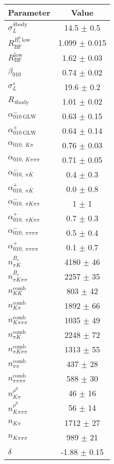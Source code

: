 \begin{table}[h]
  \centering
  \begin{tabular}{lc}
      \toprule
      Parameter & Value \\
      \midrule
      $\sigma_L^{\mathrm{4body}}$ & 14.5 $\pm$ 0.5 \\
      $R_\mathrm{BF}^{B^0_s\ \mathrm{low}}$ & 1.099 $\pm$ 0.015 \\
      $R_\mathrm{BF}^{\mathrm{low}}$ & 1.62 $\pm$ 0.03 \\
      $\beta_{010}$ & 0.74 $\pm$ 0.02 \\
      $\sigma_L^s$ & 19.6 $\pm$ 0.2 \\
      $R_{\mathrm{4body}}$ & 1.01 $\pm$ 0.02 \\
      $\alpha_{010\ \mathrm{GLW}}^-$ & 0.63 $\pm$ 0.15 \\
      $\alpha_{010\ \mathrm{GLW}}^+$ & 0.64 $\pm$ 0.14 \\
      $\alpha_{010,\ K\pi}$ & 0.76 $\pm$ 0.03 \\
      $\alpha_{010,\ K\pi\pi\pi}$ & 0.71 $\pm$ 0.05 \\
      $\alpha_{010,\ \pi K}^-$ & 0.4 $\pm$ 0.3 \\
      $\alpha_{010,\ \pi K}^+$ & 0.0 $\pm$ 0.8 \\
      $\alpha_{010,\ \pi K\pi\pi}^-$ & 1 $\pm$ 1 \\
      $\alpha_{010,\ \pi K\pi\pi}^+$ & 0.7 $\pm$ 0.3 \\
      $\alpha_{010,\ \pi\pi\pi\pi}^-$ & 0.5 $\pm$ 0.4 \\
      $\alpha_{010,\ \pi\pi\pi\pi}^+$ & 0.1 $\pm$ 0.7 \\
      $n_{\pi K}^{B_s}$ & 4180 $\pm$ 46 \\      $n_{\pi K\pi\pi}^{B_s}$ & 2257 $\pm$ 35 \\      $n_{KK}^\mathrm{comb}$ & 803 $\pm$ 42 \\      $n_{K\pi}^\mathrm{comb}$ & 1892 $\pm$ 66 \\      $n_{K\pi\pi\pi}^\mathrm{comb}$ & 1035 $\pm$ 49 \\      $n_{\pi K}^\mathrm{comb}$ & 2248 $\pm$ 72 \\      $n_{\pi K\pi\pi}^\mathrm{comb}$ & 1313 $\pm$ 55 \\      $n_{\pi\pi}^\mathrm{comb}$ & 437 $\pm$ 28 \\      $n_{\pi\pi\pi\pi}^\mathrm{comb}$ & 588 $\pm$ 30 \\      $n_{K\pi}^{\rho^0}$ & 46 $\pm$ 16 \\      $n_{K\pi\pi\pi}^{\rho^0}$ & 56 $\pm$ 14 \\      $n_{K\pi}$ & 1712 $\pm$ 27 \\      $n_{K\pi\pi\pi}$ & 989 $\pm$ 21 \\      $\delta$ & -1.88 $\pm$ 0.15 \\

\end{tabular}
\end{table}
